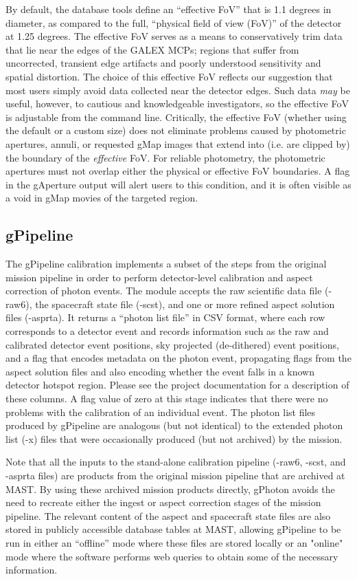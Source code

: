 \documentclass[iop]{emulateapj}
\begin{document}
By default, the database tools define an ``effective FoV'' that is 1.1 degrees in diameter, as compared to the full, ``physical field of view (FoV)'' of the detector at 1.25 degrees. The effective FoV serves as a means to conservatively trim data that lie near the edges of the GALEX MCPs; regions that suffer from uncorrected, transient edge artifacts and poorly understood sensitivity and spatial distortion. The choice of this effective FoV reflects our suggestion that most users simply avoid data collected near the detector edges. Such data \emph{may} be useful, however, to cautious and knowledgeable investigators, so the effective FoV is adjustable from the command line. Critically, the effective FoV (whether using the default or a custom size) does not eliminate problems caused by photometric apertures, annuli, or requested gMap images that extend into (i.e. are clipped by) the boundary of the \emph{effective} FoV. For reliable photometry, the photometric apertures must not overlap either the physical or effective FoV boundaries. A flag in the gAperture output will alert users to this condition, and it is often visible as a void in gMap movies of the targeted region.

\subsection{gPipeline}
The gPipeline calibration implements a subset of the steps from the original mission pipeline in order to perform detector-level calibration and aspect correction of photon events. The module accepts the raw scientific data file (-raw6), the spacecraft state file (-scst), and one or more refined aspect solution files (-asprta). It returns a ``photon list file'' in CSV format, where each row corresponds to a detector event and records information such as the raw and calibrated detector event positions, sky projected (de-dithered) event positions, and a flag that encodes metadata on the photon event, propagating flags from the aspect solution files and also encoding whether the event falls in a known detector hotspot region. Please see the project documentation for a description of these columns. A flag value of zero at this stage indicates that there were no problems with the calibration of an individual event. The photon list files produced by gPipeline are analogous (but not identical) to the extended photon list (-x) files that were occasionally produced (but not archived) by the mission.

Note that all the inputs to the stand-alone calibration pipeline (-raw6, -scst, and -asprta files) are products from the original mission pipeline that are archived at MAST. By using these archived mission products directly, gPhoton avoids the need to recreate either the ingest or aspect correction stages of the mission pipeline. The relevant content of the aspect and spacecraft state files are also stored in publicly accessible database tables at MAST, allowing gPipeline to be run in either an ``offline'' mode where these files are stored locally or an "online" mode where the software performs web queries to obtain some of the necessary information.
\end{document}
